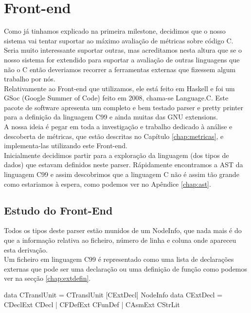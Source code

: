 \chapter{Front-end}
\minitoc
Como já tinhamos explicado na primeira milestone, decidimos que o nosso sistema vai tentar suportar ao máximo avaliação de métricas sobre código C.
Seria muito interessante suportar outras, mas acreditamos nesta altura que se o nosso sistema for extendido para suportar a avaliação de outras linguagens que não o C
então deveriamos recorrer a ferramentas externas que fizessem algum trabalho por nós.\\
Relativamente ao Front-end que utilizamos, ele está feito em Haskell e foi um GSoc (Google Summer of Code) feito em 2008, chama-se Language.C.
Este pacote de software apresenta um completo e bem testado parser e pretty printer para a definição da linguagem \textrm{C99} e ainda muitas das \textrm{GNU extensions}.\\

A nossa ideia é pegar em toda a investigação e trabalho dedicado à análise e descoberta de métricas, que estão descritas no Capítulo \ref{chap:metricas}, e implementa-las
utilizando este Front-end.\\

Inicialmente decidimos partir para a exploração da linguagem (dos tipos de dados) que estavam definidos neste parser. Rápidamente encontramos a AST da linguagem \textrm{C99}
e assim descobrimos que a linguagem C não é assim tão grande como estariamos à espera, como podemos ver no Apêndice \ref{chap:ast}.

\section{Estudo do Front-End}
Todos os tipos deste parser estão munidos de um \textrm{NodeInfo}, que nada mais é do que a informação relativa ao ficheiro, número de linha e coluna onde apareceu
esta derivação.\\
Um ficheiro em linguagem \textrm{C99} é representado como uma lista de declarações externas que pode ser uma declaração ou uma definição de função como podemos ver
na secção \ref{chap:extdefin}.

\begin{haskell}
data CTranslUnit = CTranslUnit [CExtDecl] NodeInfo
data CExtDecl = CDeclExt CDecl
              | CFDefExt CFunDef
              | CAsmExt CStrLit
\end{haskell}

